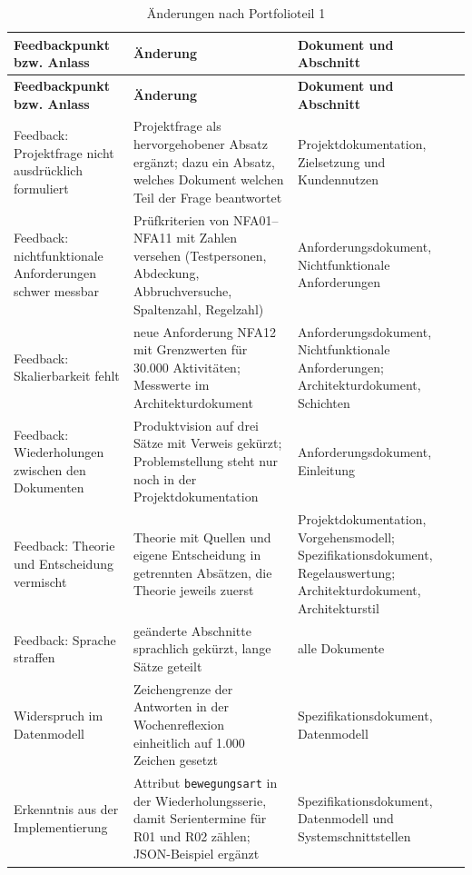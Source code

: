 \begingroup
{}
\fontsize{10pt}{12pt}\selectfont
\begin{longtable}{@{}L{4.0cm}L{7.4cm}L{4.6cm}@{}}
  \caption{Änderungen nach Portfolioteil 1}\label{tab:aenderungen}\\
  \toprule
  \textbf{Feedbackpunkt bzw. Anlass} & \textbf{Änderung} & \textbf{Dokument und Abschnitt} \\
  \midrule
  \endfirsthead
  \toprule
  \textbf{Feedbackpunkt bzw. Anlass} & \textbf{Änderung} & \textbf{Dokument und Abschnitt} \\
  \midrule
  \endhead
  \bottomrule
  \endfoot
  Feedback: Projektfrage nicht ausdrücklich formuliert & Projektfrage als hervorgehobener Absatz ergänzt; dazu ein Absatz, welches Dokument welchen Teil der Frage beantwortet & Projektdokumentation, Zielsetzung und Kundennutzen \\
  Feedback: nichtfunktionale Anforderungen schwer messbar & Prüfkriterien von NFA01--NFA11 mit Zahlen versehen (Testpersonen, Abdeckung, Abbruchversuche, Spaltenzahl, Regelzahl) & Anforderungsdokument, Nichtfunktionale Anforderungen \\
  Feedback: Skalierbarkeit fehlt & neue Anforderung NFA12 mit Grenzwerten für 30.000 Aktivitäten; Messwerte im Architekturdokument & Anforderungsdokument, Nichtfunktionale Anforderungen; Architekturdokument, Schichten \\
  Feedback: Wiederholungen zwischen den Dokumenten & Produktvision auf drei Sätze mit Verweis gekürzt; Problemstellung steht nur noch in der Projektdokumentation & Anforderungsdokument, Einleitung \\
  Feedback: Theorie und Entscheidung vermischt & Theorie mit Quellen und eigene Entscheidung in getrennten Absätzen, die Theorie jeweils zuerst & Projektdokumentation, Vorgehensmodell; Spezifikationsdokument, Regelauswertung; Architekturdokument, Architekturstil \\
  Feedback: Sprache straffen & geänderte Abschnitte sprachlich gekürzt, lange Sätze geteilt & alle Dokumente \\
  Widerspruch im Datenmodell & Zeichengrenze der Antworten in der Wochenreflexion einheitlich auf 1.000 Zeichen gesetzt & Spezifikationsdokument, Datenmodell \\
  Erkenntnis aus der Implementierung & Attribut \texttt{bewegungsart} in der Wiederholungsserie, damit Serientermine für R01 und R02 zählen; JSON-Beispiel ergänzt & Spezifikationsdokument, Datenmodell und Systemschnittstellen \\

\end{longtable}

